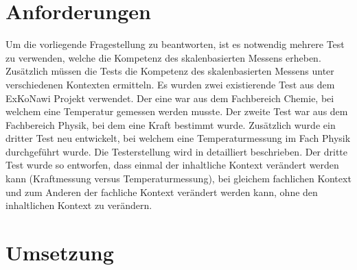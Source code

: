 
\section{Anforderungen}

Um die vorliegende Fragestellung zu beantworten, ist es notwendig mehrere Test zu verwenden, welche die Kompetenz des skalenbasierten Messens erheben. Zusätzlich müssen die Tests die Kompetenz des skalenbasierten Messens unter verschiedenen Kontexten ermitteln. Es wurden zwei existierende Test aus dem ExKoNawi Projekt verwendet. Der eine war aus dem Fachbereich Chemie, bei welchem eine Temperatur gemessen werden musste. Der zweite Test war aus dem Fachbereich Physik, bei dem eine Kraft bestimmt wurde. Zusätzlich wurde ein dritter Test neu entwickelt, bei welchem eine Temperaturmessung im Fach Physik durchgeführt wurde. Die Testerstellung wird  in \citet{Sichau2015} detailliert beschrieben. Der dritte Test wurde so entworfen, dass einmal der inhaltliche Kontext verändert werden kann (Kraftmessung versus Temperaturmessung), bei gleichem fachlichen Kontext und zum Anderen der fachliche Kontext verändert werden kann, ohne den inhaltlichen Kontext zu verändern. 


\section{Umsetzung}


